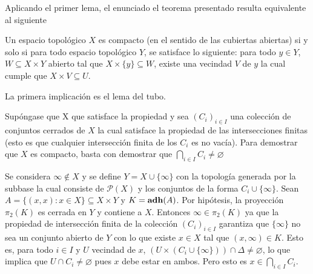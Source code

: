 Aplicando el primer lema, el enunciado el teorema presentado resulta equivalente
al siguiente

\begin{Teo}
  Un espacio topológico $X$ es compacto (en el sentido de las cubiertas abiertas) si y solo si
  para todo espacio topológico $Y$, se satisface lo siguiente: para todo $y\in Y$,
  $W\subseteq X\times Y$ abierto tal que $X\times\{y\}\subseteq W$, existe una vecindad
  $V$ de $y$ la cual cumple que $X\times V\subseteq U$.
\end{Teo}
\begin{Demo}
  La primera implicación es el lema del tubo.

  Supóngase que X que satisface la propiedad y
  sea $(C_i)_{i\in I}$ una colección de conjuntos 
  cerrados de $X$ la cual satisface la propiedad de las intersecciones 
  finitas (esto es que cualquier intersección finita 
  de los $C_i$ es no vacía). Para demostrar que $X$ es 
  compacto, basta con demostrar que $\bigcap_{i\in I}C_i\neq \varnothing$
  
  Se considera $\infty\notin X$ y se define $Y=X\cup\{\infty\}$
  con la topología generada por la subbase la cual consiste
  de $\mathcal{P}(X)$ y los conjuntos de la forma $C_i\cup\{\infty\}$.
  Sean $A = \{(x,x):x\in X\} \subseteq X\times Y$ y
  $K = \operatorname{\mathrm{\mathbf{adh}}}(A)$. Por hipótesis, la proyección $\pi_2(K)$
  es cerrada en $Y$ y contiene a $X$. Entonces 
  $\infty \in \pi_2(K)$ ya que la propiedad de intersección finita de 
  la colección $(C_i)_{i\in I}$ garantiza que $\{\infty\}$ no sea un 
  conjunto abierto de $Y$ con lo que existe $x\in X$ tal que $(x,\infty)\in K$. 
  Esto es, para todo
  $i\in I$ y $U$ vecindad de $x$, $(U\times(C_i\cup\{\infty\}))\cap\Delta\neq\varnothing$,
  lo que implica que $U\cap C_i\neq\varnothing$ pues $x$ debe estar en ambos.
  Pero esto es $x\in\bigcap_{i\in I}C_i$.
\end{Demo}
